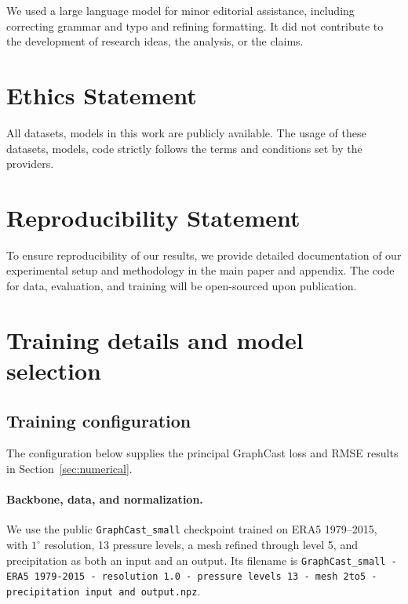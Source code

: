 \documentclass{article}
\newcommand{\suozhi}[1]{}
\renewcommand{\suozhi}[1]{}
\newcommand{\vfourchange}[1]{{\color{blue}#1}}
\begin{document}
We used a large language model for minor editorial assistance, including correcting grammar and
typo and refining formatting. It did not contribute to the development of research ideas, the analysis,
or the claims.

\section*{Ethics Statement}
All datasets, models in this work are publicly available. The usage of these datasets, models, code strictly follows the terms and conditions set by the providers. 

\section*{Reproducibility Statement}
To ensure reproducibility of our results, we provide detailed documentation of our experimental setup and methodology in the main paper and appendix. The code for data, evaluation,
and training will be open-sourced upon publication.






\clearpage
\appendix

\section{\texorpdfstring{{Training details and model selection}}{Training details and model selection}}
\label{app:training}

\subsection{Training configuration}
\label{app:training_configuration}
The configuration below supplies the principal {GraphCast loss} and RMSE results in Section~\ref{sec:numerical}.

\paragraph{\vfourchange{Backbone, data, and normalization.}}
\vfourchange{We use the public \texttt{GraphCast\_small} checkpoint trained on ERA5 1979--2015, with $1^\circ$ resolution, 13 pressure levels, a mesh refined through level 5, and precipitation as both an input and an output. Its filename is {\small\texttt{GraphCast\_small - ERA5 1979-2015 - resolution 1.0 - pressure levels 13 - mesh 2to5 - precipitation input and output.npz}}.}
\end{document}
